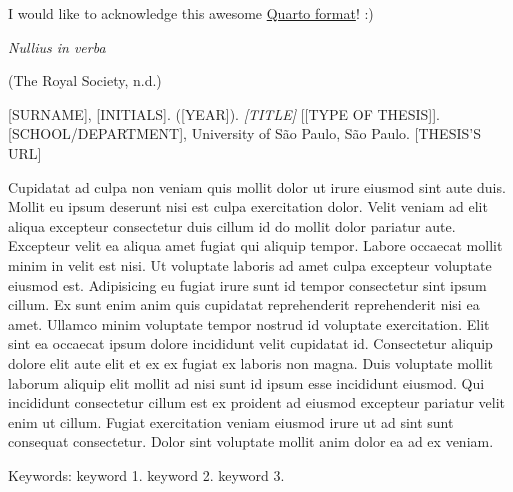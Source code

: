 \documentclass[
  12pt,
  a4paper,
  oneside]{tesesusp}
\begin{document}

\begin{agradecimentos}
I would like to acknowledge this awesome
\href{https://github.com/danielvartan/tesesusp}{Quarto format}! :)
\end{agradecimentos}


\begin{epigrafe}
  \vspace*{\fill}
	\begin{flushright}
\emph{Nullius in verba}

(The Royal Society, n.d.)
	\end{flushright}
\end{epigrafe}


\setlength{\absparsep}{18pt}
\begin{resumo}
{[}SURNAME{]}, {[}INITIALS{]}. ({[}YEAR{]}). \emph{{[}TITLE{]}}
{[}{[}TYPE OF THESIS{]}{]}. {[}SCHOOL/DEPARTMENT{]}, University of São
Paulo, São Paulo. {[}THESIS'S URL{]}

Cupidatat ad culpa non veniam quis mollit dolor ut irure eiusmod sint
aute duis. Mollit eu ipsum deserunt nisi est culpa exercitation dolor.
Velit veniam ad elit aliqua excepteur consectetur duis cillum id do
mollit dolor pariatur aute. Excepteur velit ea aliqua amet fugiat qui
aliquip tempor. Labore occaecat mollit minim in velit est nisi. Ut
voluptate laboris ad amet culpa excepteur voluptate eiusmod est.
Adipisicing eu fugiat irure sunt id tempor consectetur sint ipsum
cillum. Ex sunt enim anim quis cupidatat reprehenderit reprehenderit
nisi ea amet. Ullamco minim voluptate tempor nostrud id voluptate
exercitation. Elit sint ea occaecat ipsum dolore incididunt velit
cupidatat id. Consectetur aliquip dolore elit aute elit et ex ex fugiat
ex laboris non magna. Duis voluptate mollit laborum aliquip elit mollit
ad nisi sunt id ipsum esse incididunt eiusmod. Qui incididunt
consectetur cillum est ex proident ad eiusmod excepteur pariatur velit
enim ut cillum. Fugiat exercitation veniam eiusmod irure ut ad sint sunt
consequat consectetur. Dolor sint voluptate mollit anim dolor ea ad ex
veniam.

Keywords: keyword 1. keyword 2. keyword 3.
\end{resumo}
\end{document}
